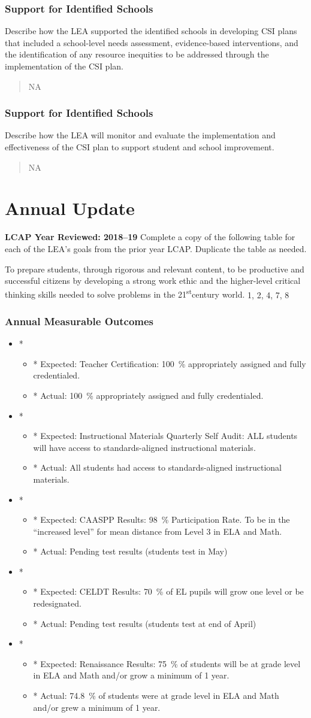 \documentclass{article}
\newcommand{\st}{\textsuperscript{st}}
\newcounter{goal}[section] %
\newcommand{\outcome}[2]{
	\item*
	\begin{itemize}
	\setlength{\itemsep}{0pt}
	\item* Expected: #1
	\item* Actual: #2
	\end{itemize}
}
\newenvironment{outcomes}
	{
		\subsubsection{Annual Measurable Outcomes}
		\begin{itemize}
	}
	{\end{itemize}}
\begin{document}
\subsubsection{Support for Identified Schools}
Describe how the LEA supported the identified schools in developing CSI plans that included a school-level needs assessment, evidence-based interventions, and the identification of any resource inequities to be addressed through the implementation of the CSI plan.
\begin{quote}
	NA
\end{quote}

\subsubsection{Support for Identified Schools}
Describe how the LEA will monitor and evaluate the implementation and effectiveness of the CSI plan to support student and school improvement.
\begin{quote}
	NA
\end{quote}

\section{Annual Update}
{\bf LCAP Year Reviewed: 2018--19}\newline
Complete a copy of the following table for each of the LEA's goals from the prior year LCAP. Duplicate the table as needed.

\Goal %
	{To prepare students, through rigorous and relevant content, to be productive and successful citizens by developing a strong work ethic and the higher-level critical thinking skills needed to solve problems in the 21\st century world.}
	{1, 2, 4, 7, 8}
	{}

\begin{outcomes}
	\outcome
		{Teacher Certification: \SI{100}{\percent} appropriately assigned and fully credentialed.}
		{\SI{100}{\percent} appropriately assigned and fully credentialed.}
	\outcome
		{Instructional Materials Quarterly Self Audit: ALL students will have access to standards-aligned instructional materials.}
		{All students had access to standards-aligned instructional materials.}
	\outcome
		{CAASPP Results: \SI{98}{\percent} Participation Rate. To be in the ``increased level'' for mean distance from Level 3 in ELA and Math.}
		{Pending test results (students test in May)}
	\outcome
		{CELDT Results: \SI{70}{\percent} of EL pupils will grow one level or be re\-designated.}
		{Pending test results (students test at end of April)}
	\outcome
		{Renaissance Results: \SI{75}{\percent} of students will be at grade level in ELA and Math and/or grow a minimum of 1 year.}
		{\SI{74.8}{\percent} of students were at grade level in ELA and Math and/or grew a minimum of 1 year.}
\end{outcomes}
\end{document}
